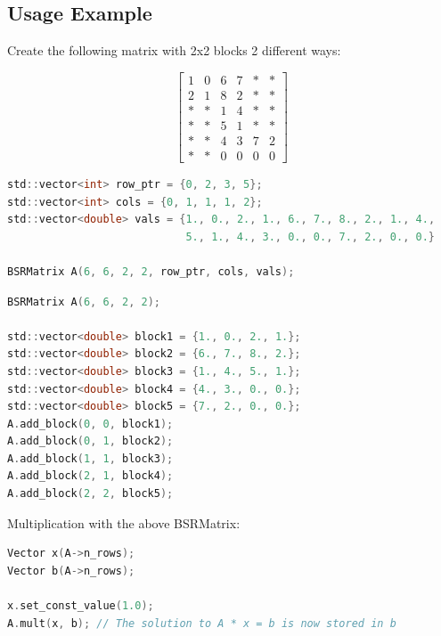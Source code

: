 \documentclass{article}
\newcommand{\bbm}{\begin{bmatrix}}
\newcommand{\ebm}{\end{bmatrix}}
\begin{document}
\subsection*{Usage Example}

Create the following matrix with 2x2 blocks 2 different ways:

\begin{equation*}
    \bbm 1 & 0 & 6 & 7 & * & * \\
         2 & 1 & 8 & 2 & * & * \\
         * & * & 1 & 4 & * & * \\
         * & * & 5 & 1 & * & * \\
         * & * & 4 & 3 & 7 & 2 \\
         * & * & 0 & 0 & 0 & 0 \ebm
\end{equation*}

\begin{lstlisting}[language=C,label=lst:bsr_mat1,caption=Creating a BSRMatrix]
std::vector<int> row_ptr = {0, 2, 3, 5};
std::vector<int> cols = {0, 1, 1, 1, 2};
std::vector<double> vals = {1., 0., 2., 1., 6., 7., 8., 2., 1., 4.,
                            5., 1., 4., 3., 0., 0., 7., 2., 0., 0.}
                            
BSRMatrix A(6, 6, 2, 2, row_ptr, cols, vals);
\end{lstlisting}

\begin{lstlisting}[language=C,label=lst:bsr_mat1,caption=Creating a BSRMatrix]
BSRMatrix A(6, 6, 2, 2);

std::vector<double> block1 = {1., 0., 2., 1.};
std::vector<double> block2 = {6., 7., 8., 2.};
std::vector<double> block3 = {1., 4., 5., 1.};
std::vector<double> block4 = {4., 3., 0., 0.};
std::vector<double> block5 = {7., 2., 0., 0.};
A.add_block(0, 0, block1);
A.add_block(0, 1, block2);
A.add_block(1, 1, block3);
A.add_block(2, 1, block4);
A.add_block(2, 2, block5);
\end{lstlisting}

Multiplication with the above BSRMatrix:

\begin{lstlisting}[language=C,label=lst:bsr_mat1,caption=Multiplication with a BSRMatrix]
Vector x(A->n_rows);
Vector b(A->n_rows);

x.set_const_value(1.0);
A.mult(x, b); // The solution to A * x = b is now stored in b

\end{lstlisting}
\end{document}

